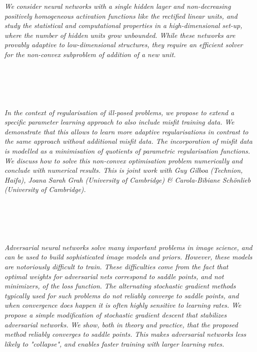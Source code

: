   \begin{multicols}{2}
      \textit{We consider neural networks with a single hidden layer and non-decreasing positively homogeneous activation functions like the rectified linear units, and study the statistical and computational properties in a high-dimensional set-up, where the number of hidden units grow unbounded. While these networks are provably adaptive to low-dimensional structures, they require an efficient solver for the non-convex subproblem of addition of a new unit.}\\
\\ 
        \\
        \\\\
\\
      \textit{In the context of regularisation of ill-posed problems, we propose to extend a specific parameter learning approach to also include misfit training data. We demonstrate that this allows to learn more adaptive regularisations in contrast to the same approach without additional misfit data. The incorporation of misfit data is modelled as a minimisation of quotients of parametric regularisation functions. We discuss how to solve this non-convex optimisation problem numerically and conclude with numerical results.  This is joint work with Guy Gilboa (Technion, Haifa), Joana Sarah Grah (University of Cambridge) \& Carola-Bibiane Schönlieb (University of Cambridge).}\\
\\ 
        \\
        \\\\
\\
      \textit{Adversarial neural networks solve many important problems in image science, and can be used to build sophisticated image models and priors.  However, these models are notoriously difficult to train. These difficulties come from the fact that optimal weights for adversarial nets correspond to saddle points, and not minimizers, of the loss function. The alternating stochastic gradient methods typically used for such problems do not reliably converge to saddle points, and when convergence does happen it is often highly sensitive to learning rates. We propose a simple modification of stochastic gradient descent that stabilizes adversarial networks. We show, both in theory and practice, that the proposed method reliably converges to saddle points. This makes adversarial networks less likely to "collapse", and enables faster training with larger learning rates.}\\

\end{multicols}
